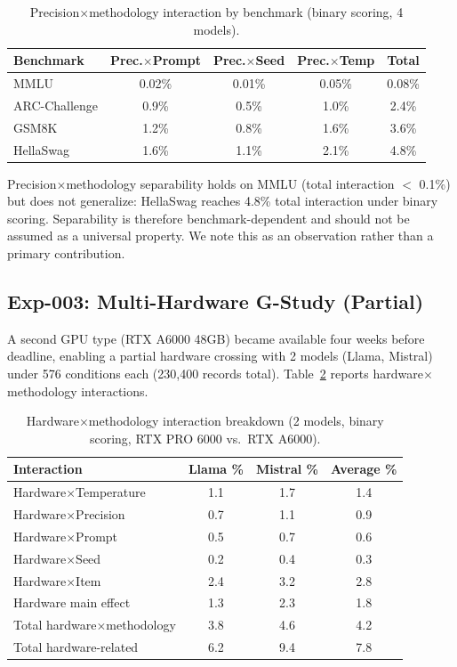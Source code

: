 \documentclass[letterpaper]{article}
\begin{document}
\begin{table}[t]
\centering
\caption{Precision$\times$methodology interaction by benchmark (binary scoring, 4 models).}
\label{tab:separability}
\begin{tabular}{lcccc}
\toprule
Benchmark & Prec.$\times$Prompt & Prec.$\times$Seed & Prec.$\times$Temp & Total \\
\midrule
MMLU          & 0.02\% & 0.01\% & 0.05\% & 0.08\% \\
ARC-Challenge & 0.9\%  & 0.5\%  & 1.0\%  & 2.4\%  \\
GSM8K         & 1.2\%  & 0.8\%  & 1.6\%  & 3.6\%  \\
HellaSwag     & 1.6\%  & 1.1\%  & 2.1\%  & 4.8\%  \\
\bottomrule
\end{tabular}
\end{table}

Precision$\times$methodology separability holds on MMLU (total interaction $<$ 0.1\%) but does not generalize: HellaSwag reaches 4.8\% total interaction under binary scoring.
Separability is therefore benchmark-dependent and should not be assumed as a universal property.
We note this as an observation rather than a primary contribution.

\subsection{Exp-003: Multi-Hardware G-Study (Partial)}
\label{sec:exp003}

A second GPU type (RTX A6000 48GB) became available four weeks before deadline, enabling a partial hardware crossing with 2 models (Llama, Mistral) under 576 conditions each (230,400 records total).
Table~\ref{tab:hardware} reports hardware$\times$methodology interactions.

\begin{table}[t]
\centering
\caption{Hardware$\times$methodology interaction breakdown (2 models, binary scoring, RTX PRO 6000 vs.\ RTX A6000).}
\label{tab:hardware}
\begin{tabular}{lccc}
\toprule
Interaction & Llama \% & Mistral \% & Average \% \\
\midrule
Hardware$\times$Temperature & 1.1 & 1.7 & 1.4 \\
Hardware$\times$Precision   & 0.7 & 1.1 & 0.9 \\
Hardware$\times$Prompt      & 0.5 & 0.7 & 0.6 \\
Hardware$\times$Seed        & 0.2 & 0.4 & 0.3 \\
Hardware$\times$Item        & 2.4 & 3.2 & 2.8 \\
Hardware main effect        & 1.3 & 2.3 & 1.8 \\
\midrule
Total hardware$\times$methodology & 3.8 & 4.6 & 4.2 \\
Total hardware-related      & 6.2 & 9.4 & 7.8 \\
\bottomrule
\end{tabular}
\end{table}
\end{document}
